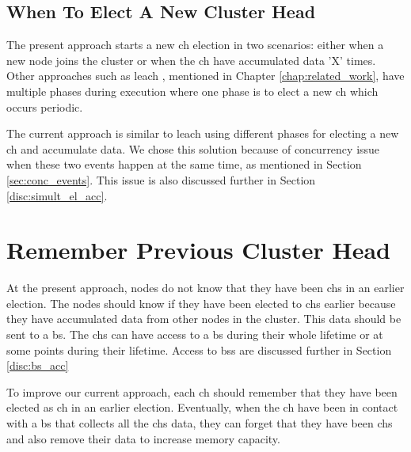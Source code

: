 \documentclass[USenglish]{uit-thesis}
\begin{document}
 
\subsection{When To Elect A New Cluster Head}
The present approach starts a new \gls{ch} election in two scenarios: either when a new node joins the cluster or when the \gls{ch} have accumulated data 'X' times. Other approaches such as \gls{leach} \cite{leach}, mentioned in Chapter \ref{chap:related_work}, have multiple phases during execution where one phase is to elect a new \gls{ch} which occurs periodic.


The current approach is similar to \gls{leach} using different phases for electing a new \gls{ch} and accumulate data. We chose this solution because of concurrency issue when these two events happen at the same time, as mentioned in Section \ref{sec:conc_events}. This issue is also discussed further in Section \ref{disc:simult_el_acc}.



\section{Remember Previous Cluster Head}
At the present approach, nodes do not know that they have been \glspl{ch} in an earlier election. The nodes should know if they have been elected to \glspl{ch} earlier because they have accumulated data from other nodes in the cluster. This data should be sent to a \gls{bs}. The \glspl{ch} can have access to a \gls{bs} during their whole lifetime or at some points during their lifetime. Access to \glspl{bs} are discussed further in Section \ref{disc:bs_acc}

To improve our current approach, each \gls{ch} should remember that they have been elected as \gls{ch} in an earlier election. Eventually, when the \gls{ch} have been in contact with a \gls{bs} that collects all the \glspl{ch} data, they can forget that they have been \glspl{ch} and also remove their data to increase memory capacity.


\end{document}
